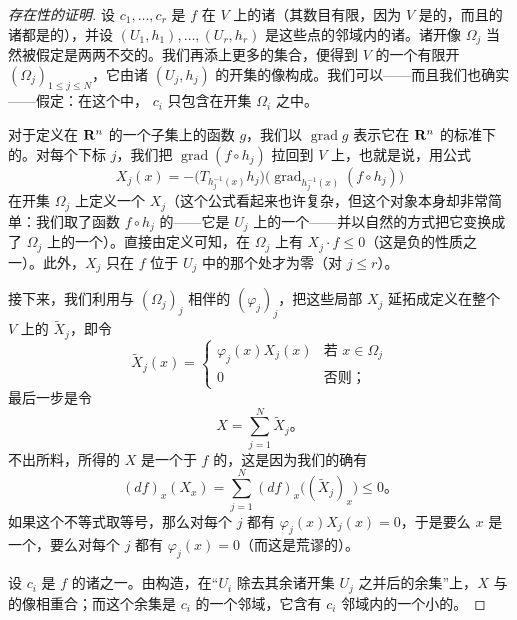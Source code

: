 \begin{proof}[\trPseudogradient{}存在性的证明]
设 $c_1,\dotsc,c_r$ 是 $f$ 在\trManifold{} $V$ 上的诸\trCriticalPoint{}（其数目有限，因为 $V$ 是\trCompact{}的，而且\trMorseFunction{}的诸\trCriticalPoint{}都是\trIsolated{}的），并设 $(U_1,h_1),\dotsc,(U_r,h_r)$ 是这些点的邻域内的诸\trMorseChart。诸开像 $\Omega_j$ 当然被假定是两两不交的。我们再添上更多的集合，便得到 $V$ 的一个有限开\trCovering{} $(\Omega_j)_{1\le j\le N}$，它由诸\trChart{} $(U_j,h_j)$ 的开集的像构成。我们可以——而且我们也确实——假定：在这个\trCovering{}中，\trCriticalPoint{} $c_i$ 只包含在开集 $\Omega_i$ 之中。

对于定义在 $\mathbf{R}^n$ 的一个\trOpen{}子集上的函数 $g$，我们以 $\operatorname{grad}g$ 表示它在 $\mathbf{R}^n$ 的标准\trEuclidean\trMetric{}下的\trGradient。对每个下标 $j$，我们把 $\operatorname{grad}(f\circ h_j)$ 拉回到 $V$ 上，也就是说，用公式
\[
X_j(x)=-\bigl(T_{h_j^{-1}(x)}h_j\bigr)\bigl(\operatorname{grad}_{h_j^{-1}(x)}(f\circ h_j)\bigr)
\]
在开集 $\Omega_j$ 上定义一个\trVectorField{} $X_j$（这个公式看起来也许复杂，但这个对象本身却非常简单：我们取了函数 $f\circ h_j$ 的\trGradient——它是 $U_j$ 上的一个\trVectorField——并以自然的方式把它变换成了 $\Omega_j$ 上的一个\trVectorField）。直接由定义可知，在 $\Omega_j$ 上有 $X_j\cdot f\le 0$（这是负\trGradient{}的性质之一）。此外，$X_j$ 只在 $f$ 位于 $U_j$ 中的那个\trCriticalPoint{}处才为零（对 $j\le r$）。

接下来，我们利用与\trCovering{} $(\Omega_j)_j$ 相伴的\trPartitionOfUnity{} $(\varphi_j)_j$，把这些局部\trVectorField{} $X_j$ 延拓成定义在整个 $V$ 上的\trVectorField{} $\widetilde{X}_j$，即令
\[
\widetilde{X}_j(x)=
\begin{cases}
\varphi_j(x)X_j(x) & \text{若 } x\in\Omega_j\\
0 & \text{否则；}
\end{cases}
\]
最后一步是令
\[
X=\sum_{j=1}^{N}\widetilde{X}_j\text{。}
\]
不出所料，所得的\trVectorField{} $X$ 是一个\trAdapted{}于 $f$ 的\trPseudogradient，这是因为我们的确有
\[
(df)_x(X_x)=\sum_{j=1}^{N}(df)_x\bigl((\widetilde{X}_j)_x\bigr)\le 0\text{。}
\]
如果这个不等式取等号，那么对每个 $j$ 都有 $\varphi_j(x)X_j(x)=0$，于是要么 $x$ 是一个\trCriticalPoint，要么对每个 $j$ 都有 $\varphi_j(x)=0$（而这是荒谬的）。

设 $c_i$ 是 $f$ 的诸\trCriticalPoint{}之一。由构造，在“$U_i$ 除去其余诸开集 $U_j$ 之并后的余集”上，$X$ 与\trEuclidean\trGradient{}的像相重合；而这个余集是 $c_i$ 的一个邻域，它含有 $c_i$ 邻域内的一个小的\trMorseChart。
\end{proof}

